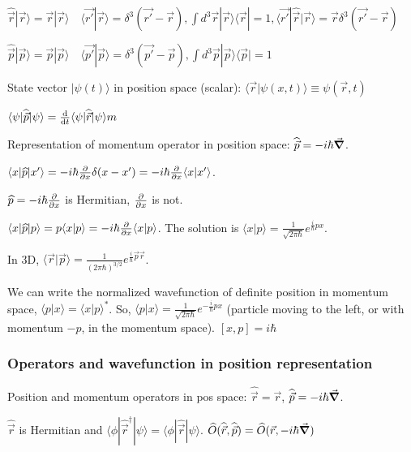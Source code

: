 $\widehat{\vec{r}} | \vec{r} \rangle = \vec{r} | \vec{r} \rangle \quad \langle \vec{r'} | \vec{r} \rangle = \delta^3 (\vec{r'} - \vec{r}), \int d^3 \vec{r} |\vec{r} \rangle \langle \vec{r} | = 1, \langle \vec{r'} | \hat{\vec{r}} | \vec{r} \rangle = \vec{r} \delta^3(\vec{r'} - \vec{r})$

$\widehat{\vec{p}} | \vec{p} \rangle = \vec{p} | \vec{p} \rangle \quad \langle \vec{p'} | \vec{p} \rangle = \delta^3(\vec{p'} - \vec{p}), \int d^3 \vec{p} | \vec{p} \rangle \langle \vec{p} | = 1$

State vector $| \psi(t) \rangle$ in position space (scalar): $\langle \vec{r} | \psi(x, t) \rangle \equiv \psi(\vec{r}, t)$

$\langle \psi | \widehat{\vec{p}} | \psi \rangle = \dv{}{t} \langle \psi | \widehat{\vec{r}} | \psi \rangle m$

Representation of momentum operator in position space: $\widehat{\vec{p}} = -i \hbar \vec{\grad}$.

$\langle x | \widehat{p} | x' \rangle = -i \hbar \pdv{}{x} \delta(x - x') = -i \hbar \pdv{}{x} \langle x | x' \rangle$.

$\widehat{p} = -i \hbar \pdv{}{x}$ is Hermitian, $\pdv{}{x}$ is not.

$\langle x | \widehat{p} | p \rangle = p \langle x | p \rangle = -i \hbar \pdv{}{x} \langle x | p \rangle$. The solution is $\langle x | p \rangle = \frac{1}{\sqrt{2 \pi \hbar}} e^{\frac{i}{\hbar} px}$. 

In 3D, $\langle \vec{r} | \vec{p} \rangle = \frac{1}{(2 \pi \hbar)^{3/2}} e^{\frac{i}{\hbar} \vec{p} \vec{r}}$.

We can write the normalized wavefunction of definite position in momentum space, $\langle p | x \rangle = \langle x | p \rangle^*$. So, $\langle p | x \rangle = \frac{1}{\sqrt{2 \pi \hbar}} e^{-\frac{i}{\hbar} px}$ (particle moving to the left, or with momentum $-p$, in the momentum space).
$[x, p] = i \hbar$

\subsubsection{Operators and wavefunction in position representation}

Position and momentum operators in pos space: $\widehat{\vec{r}} = \vec{r}$, $\widehat{\vec{p}} = -i \hbar \vec{\grad}$.

$\widehat{\vec{r}}$ is Hermitian and $\langle \phi | \widehat{\vec{r}}^{\dag} | \psi \rangle = \langle \phi | \widehat{\vec{r}} | \psi \rangle$.
$\widehat{O}(\widehat{\vec{r}}, \widehat{\vec{p}}) = \widehat{O} (\vec{r}, -i \hbar \vec{\grad})$

